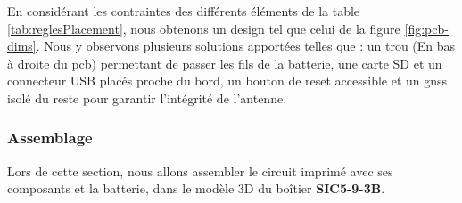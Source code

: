 En considérant les contraintes des différents éléments de la table \ref{tab:reglesPlacement}, nous obtenons un design tel que celui de la figure \ref{fig:pcb-dims}. Nous y observons plusieurs solutions apportées telles que :
un trou (En bas à droite du \gls{pcb}) permettant de passer les fils de la batterie, une carte SD et un connecteur USB placés proche du bord, un bouton de reset accessible et un \gls{gnss} isolé du reste pour garantir l'intégrité de l'antenne. 

\subsubsection{Assemblage}
Lors de cette section, nous allons assembler le circuit imprimé avec ses composants et la batterie, dans le modèle 3D du boîtier \textbf{SIC5-9-3B}.

